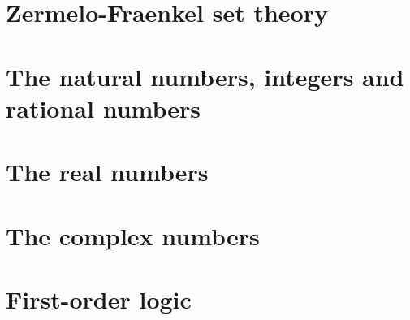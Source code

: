 \documentclass[10pt, a4paper]{report}
\theoremstyle{definition}
\begin{document}
\tableofcontents
\newpage


\chapter{Zermelo-Fraenkel set theory}\label{chap:zermelo_fraenkel_set_theory}

\newpage

\chapter{The natural numbers, integers and rational numbers}\label{chap:the_natural_numbers_integers_and_rational_numbers}

\newpage

\chapter{The real numbers}\label{chap:the_real_numbers}

\newpage

\chapter{The complex numbers}\label{chap:the_complex_numbers}

\newpage

\printbibliography[title={Bibliography}]

\appendix

\chapter{First-order logic}\label{app:first_order_logic}

\end{document}
